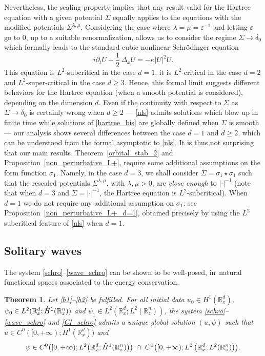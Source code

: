 \documentclass[JEP,XML,SOM,NoEqCountersInSection,NoFloatCountersInSection,Unicode,published]{cedram}
\let\epsilon\varepsilon
\newtheorem{theo}[lemma]{Theorem}
\theoremstyle{definition}
\newcommand*{\overbigdot}[1]{%
\accentset{\mbox{\large\bfseries .}}{#1}}
\newcommand{\R}{\mathbb{R}}
\begin{document}
Nevertheless, the scaling property implies that any result valid for the Hartree equation with a given potential $\Sigma$ equally applies
to the equations with the modified potentials $\Sigma^{\lambda,\mu}$. Considering the case where $\lambda=\mu=\epsilon^{-1}$ and letting
$\epsilon$ go to $ 0$, up to a suitable renormalization,
allows us to consider the regime $\Sigma\to\delta_{0}$ which formally leads to the standard cubic nonlinear Schrödinger equation
\begin{equation}\label{nls}
i\partial_{t} U+\frac{1}{2}\,\Delta_{x}U=-\kappa|U|^{2}U.
\end{equation}
This equation is $L^{2}$-subcritical in the case $d=1$, it is $L^{2}$-critical in the case $d=2$ and $L^{2}$-super-critical in the case $d\geq 3$. Hence, this formal limit suggests different behaviors for the Hartree equation (when a smooth potential is considered), depending on the dimension $d$.
Even if the continuity with respect to $\Sigma$ as $\Sigma\to\delta_{0}$ is certainly wrong when $d\geq 2$ --- \eqref{nls} admits solutions which blow up in finite time while solutions of \eqref{hartree_bis} are globally defined when $\Sigma$ is smooth --- our analysis shows several differences between the case $d=1$ and $d\geq 2$, which can be understood from the formal asymptotic to \eqref{nls}. It is thus not surprising that our main results, Theorem~\ref{orbital_stab_2} and Proposition~\ref{non_perturbative_L+}, require some additional assumptions on the form function $\sigma_{1}$. Namely, in the case $d=3$, we shall
consider $\Sigma=\sigma_{1}\star\sigma_{1}$ such that
the rescaled potentials $\Sigma^{\lambda,\mu}$, with $\lambda,\mu>0$, are \emph{close enough} to $|\cdot|^{-1}$ (note that when $d=3$ and $\Sigma=|\cdot|^{-1}$, the Hartree equation is $L^{2}$-subcritical). When $d=1$ we do not require any additional assumption on $\sigma_{1}$: see Proposition~\ref{non_perturbative_L+_d=1},
obtained precisely by using the $L^2$ subcritical feature of \eqref{nls} when $d=1$.

\subsection{Solitary waves}

The system \eqref{schro}--\eqref{wave_schro} can be shown to be well-posed,
in~natural functional spaces associated to the energy conservation.

\begin{theo}\label{TC}
Let \eqref{h1}--\eqref{h2} be fulfilled. For all initial data $u_{0}\in H^{1}(\R_{x}^{d})$, $\psi_{0}\in\nobreak L^{2}(\R_{x}^{d};\overbigdot{H}^{1}(\R_{z}^{n}))$ and $\psi_{1}\in L^{2}(\R_{x}^{d};L^{2}(\R_{z}^{n}))$, the system \eqref{schro}--\eqref{wave_schro} and \eqref{CI_schro} admits a unique global solution $(u,\psi)$ such that $u\in C^{0}([0,+\infty);H^{1}(\R_{x}^{d}))$ and
\[
\psi\in C^{0}\bigl([0,+\infty);L^{2}\bigl(\R_{x}^{d};\overbigdot{H}^{1}(\R_{z}^{n})\bigr)\bigr)\;\cap\;C^{1}\bigl([0,+\infty);L^{2}\left(\R_{x}^{d};L^{2}(\R_{z}^{n})\right)\bigr).
\]
\end{theo}
\end{document}
